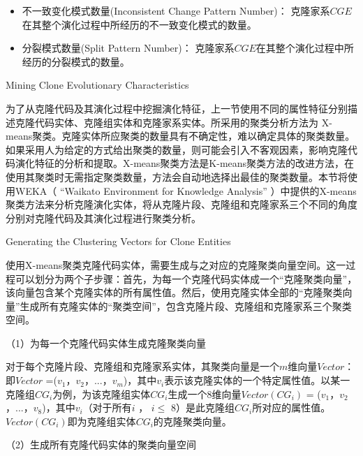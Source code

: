 \begin{itemize}
\item
不一致变化模式数量(Inconsistent Change Pattern Number)：
克隆家系{$CGE$}在其整个演化过程中所经历的不一致变化模式的数量。
\item
分裂模式数量(Split Pattern Number)：
克隆家系{$CGE$}在其整个演化过程中所经历的分裂模式的数量。
\end{itemize}

{Mining Clone Evolutionary Characteristics}

为了从克隆代码及其演化过程中挖掘演化特征，上一节使用不同的属性特征分别描述克隆代码实体、克隆组实体和克隆家系实体。所采用的聚类分析方法为 X-means\cite{pelleg2000x}聚类。克隆实体所应聚类的数量具有不确定性，难以确定具体的聚类数量。如果采用人为给定的方式给出聚类的数量，则可能会引入不客观因素，影响克隆代码演化特征的分析和提取。X-means聚类方法是K-means聚类方法的改进方法，在使用其聚类时无需指定聚类数量，方法会自动地选择出最佳的聚类数量。本节将使用WEKA（ “Waikato Environment for Knowledge Analysis” \cite{hall2009weka}）中提供的X-means聚类方法来分析克隆演化实体，将从克隆片段、克隆组和克隆家系三个不同的角度分别对克隆代码及其演化过程进行聚类分析。

{Generating the Clustering Vectors for Clone Entities}

使用X-means聚类克隆代码实体，需要生成与之对应的克隆聚类向量空间。这一过程可以划分为两个子步骤：首先，为每一个克隆代码实体成一个“克隆聚类向量”，该向量包含某个克隆实体的所有属性值。然后，使用克隆实体全部的“克隆聚类向量”生成所有克隆实体的“聚类空间”，包含克隆片段、克隆组和克隆家系三个聚类空间。

（1）为每一个克隆代码实体生成克隆聚类向量

对于每个克隆片段、克隆组和克隆家系实体，其聚类向量是一个$m$维向量$Vector$：即{$Vector$ ={($v_1$，$v_2$，$...$，$v_m$)}}，其中$v_i$表示该克隆实体的一个特定属性值。以某一克隆组{$CG_i$}为例，为该克隆组实体{$CG_i$}生成一个8维向量{$Vector(CG_i)$ = ($v_1$，$v_2$，$...$，$v_8$)}，其中$v_i$（对于所有$i$ ， $i \leq $ 8）是此克隆组{$CG_i$}所对应的属性值。$Vector(CG_i)$即为克隆组实体{$CG_i$}的克隆聚类向量。
 
（2）生成所有克隆代码实体的聚类向量空间

